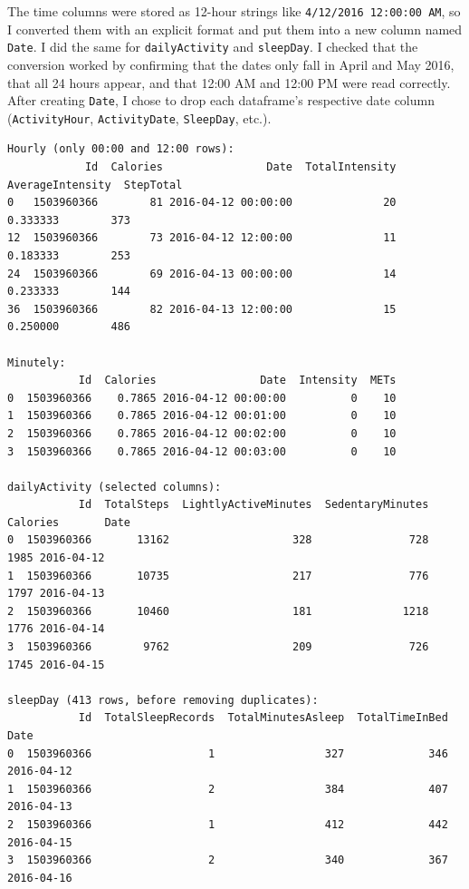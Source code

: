 \documentclass[11pt]{article}
\begin{document}
The time columns were stored as 12-hour strings like \texttt{4/12/2016 12:00:00 AM}, so I converted them with an explicit format and put them into a new column named \texttt{Date}.
I did the same for \texttt{dailyActivity} and \texttt{sleepDay}.
I checked that the conversion worked by confirming that the dates only fall in April and May 2016, that all 24 hours appear, and that 12:00 AM and 12:00 PM were read correctly.
After creating \texttt{Date}, I chose to drop each dataframe's respective date column (\texttt{ActivityHour}, \texttt{ActivityDate}, \texttt{SleepDay}, etc.).

	{\footnotesize
		\begin{verbatim}
Hourly (only 00:00 and 12:00 rows):
            Id  Calories                Date  TotalIntensity  AverageIntensity  StepTotal
0   1503960366        81 2016-04-12 00:00:00              20          0.333333        373
12  1503960366        73 2016-04-12 12:00:00              11          0.183333        253
24  1503960366        69 2016-04-13 00:00:00              14          0.233333        144
36  1503960366        82 2016-04-13 12:00:00              15          0.250000        486

Minutely:
           Id  Calories                Date  Intensity  METs
0  1503960366    0.7865 2016-04-12 00:00:00          0    10
1  1503960366    0.7865 2016-04-12 00:01:00          0    10
2  1503960366    0.7865 2016-04-12 00:02:00          0    10
3  1503960366    0.7865 2016-04-12 00:03:00          0    10

dailyActivity (selected columns):
           Id  TotalSteps  LightlyActiveMinutes  SedentaryMinutes  Calories       Date
0  1503960366       13162                   328               728      1985 2016-04-12
1  1503960366       10735                   217               776      1797 2016-04-13
2  1503960366       10460                   181              1218      1776 2016-04-14
3  1503960366        9762                   209               726      1745 2016-04-15

sleepDay (413 rows, before removing duplicates):
           Id  TotalSleepRecords  TotalMinutesAsleep  TotalTimeInBed       Date
0  1503960366                  1                 327             346 2016-04-12
1  1503960366                  2                 384             407 2016-04-13
2  1503960366                  1                 412             442 2016-04-15
3  1503960366                  2                 340             367 2016-04-16
\end{verbatim}
	}
\end{document}
